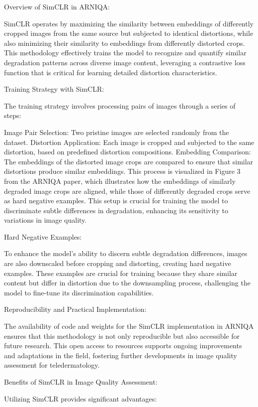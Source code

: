 Overview of SimCLR in ARNIQA:

SimCLR operates by maximizing the similarity between embeddings of differently cropped images from the same source but subjected to identical distortions, while also minimizing their similarity to embeddings from differently distorted crops. This methodology effectively trains the model to recognize and quantify similar degradation patterns across diverse image content, leveraging a contrastive loss function that is critical for learning detailed distortion characteristics.

Training Strategy with SimCLR:

The training strategy involves processing pairs of images through a series of steps:

Image Pair Selection: Two pristine images are selected randomly from the dataset.
Distortion Application: Each image is cropped and subjected to the same distortion, based on predefined distortion compositions.
Embedding Comparison: The embeddings of the distorted image crops are compared to ensure that similar distortions produce similar embeddings.
This process is visualized in Figure 3 from the ARNIQA paper, which illustrates how the embeddings of similarly degraded image crops are aligned, while those of differently degraded crops serve as hard negative examples. This setup is crucial for training the model to discriminate subtle differences in degradation, enhancing its sensitivity to variations in image quality.

Hard Negative Examples:

To enhance the model’s ability to discern subtle degradation differences, images are also downscaled before cropping and distorting, creating hard negative examples. These examples are crucial for training because they share similar content but differ in distortion due to the downsampling process, challenging the model to fine-tune its discrimination capabilities.

Reproducibility and Practical Implementation:

The availability of code and weights for the SimCLR implementation in ARNIQA ensures that this methodology is not only reproducible but also accessible for future research. This open access to resources supports ongoing improvements and adaptations in the field, fostering further developments in image quality assessment for teledermatology.

Benefits of SimCLR in Image Quality Assessment:

Utilizing SimCLR provides significant advantages:

